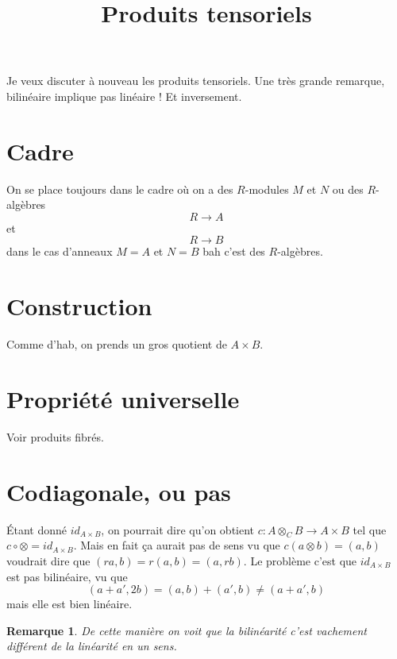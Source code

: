 \documentclass[a4paper,12pt]{book}
\title{Produits tensoriels}
\date{}
\theoremstyle{plain}
\newtheorem{rem}{Remarque}
\theoremstyle{definition}
\theoremstyle{remark}
\begin{document}
\maketitle
Je veux discuter à nouveau les produits tensoriels. Une très grande
remarque, bilinéaire implique pas linéaire ! Et inversement.

\section{Cadre}
On se place toujours dans le cadre où on a des $R$-modules $M$ et 
$N$ ou des $R$-algèbres
\[R\to A\]
et
\[R\to B\]
dans le cas d'anneaux $M=A$ et $N=B$ bah c'est des $R$-algèbres.
\section{Construction}
Comme d'hab, on prends un gros quotient de $A\times B$.
\section{Propriété universelle}
Voir produits fibrés.

\section{Codiagonale, ou pas}
Étant donné $id_{A\times B}$, on pourrait dire qu'on obtient
$c\colon A\otimes_C B \to
A\times B$ tel que $c\circ \otimes =id_{A\times B}$. Mais en fait
ça aurait pas de sens vu que $c(a\otimes b)=(a,b)$ voudrait dire
que $(ra,b)=r(a,b)=(a,rb)$. Le problème c'est que $id_{A\times B}$
est pas bilinéaire, vu que 
\[(a+a',2b)=(a,b)+(a',b)\ne (a+a',b)\]
mais elle est bien linéaire.
\begin{rem}
    De cette manière on voit que la bilinéarité c'est vachement
    différent de la linéarité en un sens.
\end{rem}
\end{document}
